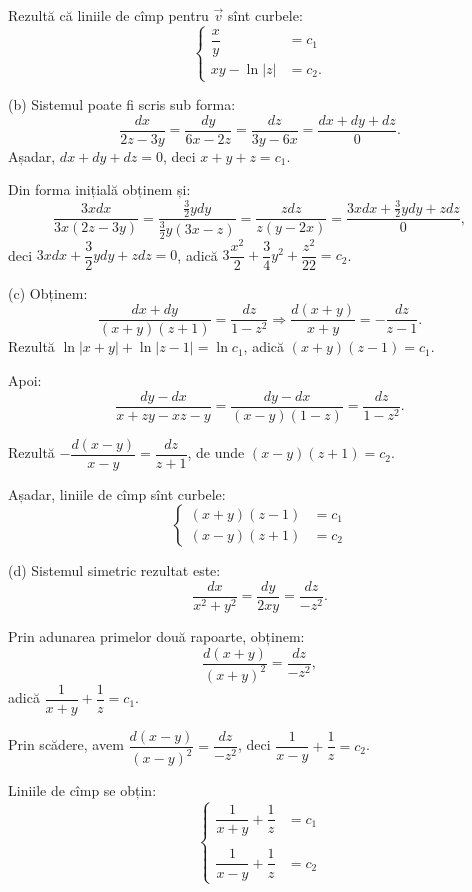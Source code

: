 Rezultă că liniile de cîmp pentru $\vec{v}$ sînt curbele:
\[
  \begin{cases}
    \dfrac{x}{y} &= c_1 \\
    xy - \ln|z| &= c_2.
  \end{cases}
\]

\vspace{0.3cm}

(b) Sistemul poate fi scris sub forma:
\[
  \frac{dx}{2z - 3y} = \frac{dy}{6x - 2z} = \frac{dz}{3y-6x} = \frac{dx + dy + dz}{0}.
\]
Așadar, $dx + dy + dz = 0$, deci $x + y + z = c_1$.

Din forma inițială obținem și:
\[
  \frac{3xdx}{3x(2z - 3y)} = \frac{\frac{3}{2}ydy}{\frac{3}{2}y(3x - z)} = \frac{zdz}{z(y - 2x)} = %
  \frac{3xdx + \frac{3}{2}ydy + zdz}{0},
\]
deci $3xdx + \dfrac{3}{2}ydy + zdz = 0$, adică
$3\dfrac{x^2}{2} + \dfrac{3}{4}y^2 + \dfrac{z^2}{22} = c_2$.

\vspace{0.3cm}

(c) Obținem:
\[
  \frac{dx + dy}{(x + y)(z + 1)} = \frac{dz}{1 - z^2} \Rightarrow %
  \frac{d(x + y)}{x + y} = -\frac{dz}{z - 1}.
\]
Rezultă $\ln|x + y| + \ln|z - 1| = \ln c_1$, adică $(x + y)(z - 1) = c_1$.

Apoi:
\[
  \frac{dy - dx}{x + zy - xz - y} = \frac{dy - dx}{(x - y)(1 - z)} = \frac{dz}{1 - z^2}.
\]

Rezultă $-\dfrac{d(x - y)}{x - y} = \dfrac{dz}{z + 1}$, de unde $(x - y)(z + 1) = c_2$.

Așadar, liniile de cîmp sînt curbele:
\[
  \begin{cases}
    (x + y)(z - 1) &= c_1 \\
    (x - y)(z + 1) &= c_2
  \end{cases}
\]

\vspace{0.3cm}

(d) Sistemul simetric rezultat este:
\[
  \frac{dx}{x^2 + y^2} = \frac{dy}{2xy} = \frac{dz}{-z^2}.
\]

Prin adunarea primelor două rapoarte, obținem:
\[
  \frac{d(x + y)}{(x + y)^2} = \frac{dz}{-z^2},
\]
adică $\dfrac{1}{x + y} + \dfrac{1}{z} = c_1$.

Prin scădere, avem $\dfrac{d(x - y)}{(x - y)^2} = \dfrac{dz}{-z^2}$, deci
$\dfrac{1}{x - y} + \dfrac{1}{z} = c_2$.

Liniile de cîmp se obțin:
\[
  \begin{cases}
    \dfrac{1}{x + y} + \dfrac{1}{z} &= c_1 \\
    & \\
    \dfrac{1}{x - y} + \dfrac{1}{z} &= c_2
  \end{cases}
\]


